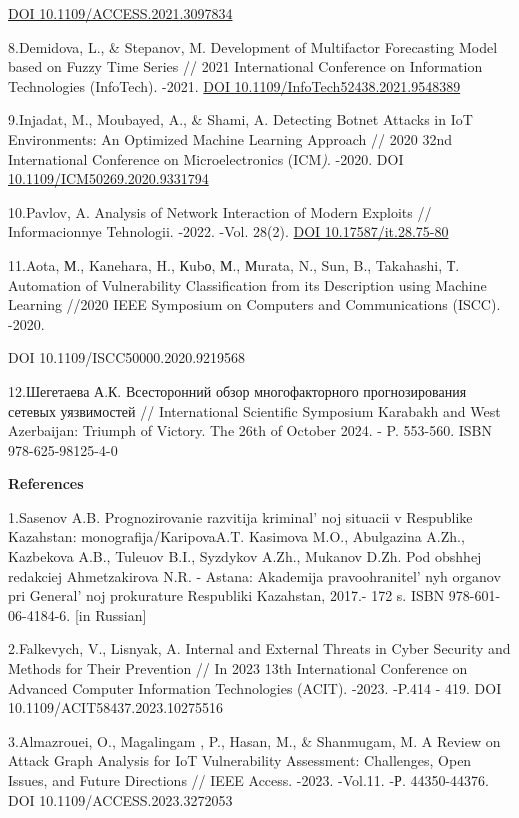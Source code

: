 \href{https://doi.org/10.1109/ACCESS.2021.3097834}{DOI
10.1109/ACCESS.2021.3097834}

8.Demidova, L., \& Stepanov, M. Development of Multifactor Forecasting
Model based on Fuzzy Time Series // 2021 International Conference on
Information Technologies (InfoTech). -2021.
\href{https://doi.org/10.1109/InfoTech52438.2021.9548389}{DOI
10.1109/InfoTech52438.2021.9548389}

9.Injadat, M., Moubayed, A., \& Shami, A. Detecting Botnet Attacks in
IoT Environments: An Optimized Machine Learning Approach // 2020 32nd
International Conference on Microelectronics (ICM\emph{)}. -2020. DOI
\href{https://doi.org/10.1109/ICM50269.2020.9331794}{10.1109/ICM50269.2020.9331794}

10.Pavlov, A. Analysis of Network Interaction of Modern Exploits //
Informacionnye Tehnologii. -2022. -Vol. 28(2).
\href{https://doi.org/10.17587/it.28.75-80}{DOI 10.17587/it.28.75-80}

11.Aota, М., Kanehara, H., Кubо, М., Мurata, N., Sun, B., Takahashi, Т.
Automation of Vulnerability Classification from its Description using
Machine Learning //2020 IEEE Symposium on Computers and Communications
(ISCC). -2020.

DOI 10.1109/ISCC50000.2020.9219568

12.Шегетаева А.К. Всесторонний обзор многофакторного прогнозирования
сетевых уязвимостей // International Scientific Symposium Karabakh and
West Azerbaijan: Triumph of Victory. The 26th of October 2024. - P.
553-560. ISBN 978-625-98125-4-0

{\bfseries References}

1.Sasenov A.B. Prognozirovanie razvitija kriminal' noj
situacii v Respublike Kazahstan: monografija/KaripovaA.T. Kasimova M.O.,
Abulgazina A.Zh., Kazbekova A.B., Tuleuov B.I., Syzdykov A.Zh., Mukanov
D.Zh. Pod obshhej redakciej Ahmetzakirova N.R. - Astana: Akademija
pravoohranitel' nyh organov pri
General' noj prokurature Respubliki Kazahstan, 2017.- 172
s. ISBN 978-601-06-4184-6. {[}in Russian{]}

2.Falkevych, V., Lisnyak, A. Internal and External Threats in Cyber
Security and Methods for Their Prevention // In 2023 13th International
Conference on Advanced Computer Information Technologies (ACIT). -2023.
-P.414 - 419. DOI 10.1109/ACIT58437.2023.10275516

3.Almazrouei, O., Magalingam , P., Hasan, M., \& Shanmugam, M. A Review
on Attack Graph Analysis for IoT Vulnerability Assessment: Challenges,
Open Issues, and Future Directions // IEEE Access. -2023. -Vol.11. -Р.
44350-44376. DOI 10.1109/ACCESS.2023.3272053

